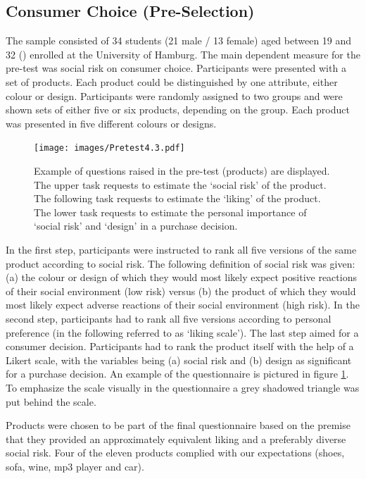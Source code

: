 \subsection{Consumer Choice (Pre-Selection)}\label{sec:consumerchoice}
The sample consisted of 34 students (21 male / 13 female) aged between 19 and 32 () enrolled at the University of Hamburg. The main dependent measure for the pre-test was social risk on consumer choice. Participants were presented with a set of products. Each product could be distinguished by one attribute, either colour or design. Participants were randomly assigned to two groups and were shown sets of either five or six products, depending on the group. Each product was presented in five different colours or designs. \par
\begin{figure}[h!]
\center
		\texttt{[image: images/Pretest4.3.pdf]}
  \caption{Example of questions raised in the pre-test (products) are displayed. The upper task requests to estimate the ‘social risk’ of the product. The following task requests to estimate the ‘liking’ of the product. The lower task requests to estimate the personal importance of ‘social risk’ and ‘design’ in a purchase decision.}\label{fig:pretest_sample_shoes}
\end{figure}
In the first step, participants were instructed to rank all five versions of the same product according to social risk. The following definition of social risk was given: (a) the colour or design of which they would most likely expect positive reactions of their social environment (low risk) versus (b) the product of which they would most likely expect adverse reactions of their social environment (high risk). In the second step, participants had to rank all five versions according to personal preference (in the following referred to as ‘liking scale’). The last step aimed for a consumer decision. Participants had to rank the product itself with the help of a Likert scale, with the variables being (a) social risk and (b) design as significant for a purchase decision. An example of the questionnaire is pictured in figure \ref{fig:pretest_sample_shoes}. To emphasize the scale visually in the questionnaire a grey shadowed triangle was put behind the scale.\par
Products were chosen to be part of the final questionnaire based on the premise that they provided an approximately equivalent liking and a preferably diverse social risk. Four of the eleven products complied with our expectations (shoes, sofa, wine, mp3 player and car). \par
